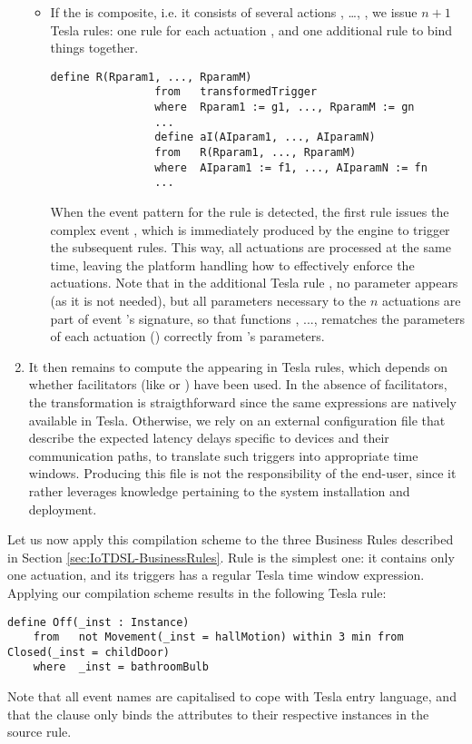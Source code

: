 \begin{enumerate}
\begin{itemize}
		\item If the  is composite, i.e. it consists of several actions , \ldots, , we issue $n+1$ Tesla rules: one rule for each actuation , and one additional rule to bind things together.
		\begin{center}
			\begin{lstlisting}[language=tesla, numbers=none]
				define R(Rparam1, ..., RparamM)
				from   transformedTrigger
				where  Rparam1 := g1, ..., RparamM := gn
				...
				define aI(AIparam1, ..., AIparamN)
				from   R(Rparam1, ..., RparamM)
				where  AIparam1 := f1, ..., AIparamN := fn
				...
			\end{lstlisting}
		\end{center}
		When the event pattern for the rule  is detected, the first rule issues the complex event , which is immediately produced by the \CEP engine to trigger the subsequent rules. This way, all actuations are processed at the same time, leaving the platform handling how to effectively enforce the actuations. Note that in the additional Tesla rule , no  parameter appears (as it is not needed), but all parameters necessary to the $n$ actuations are part of event 's signature, so that functions , ...,  rematches the parameters of each actuation () correctly from 's parameters.
	\end{itemize}
	\item It then remains to compute the  appearing in Tesla rules, which depends on whether facilitators (like  or ) have been used. In the absence of facilitators, the transformation is straigthforward since the same expressions are natively available in Tesla. Otherwise, we rely on an external configuration file that describe the expected latency delays specific to devices and their communication paths, to translate such triggers into appropriate time windows. Producing this file is not the responsibility of the end-user, since it rather leverages knowledge pertaining to the \IOT system installation and deployment. 
\end{enumerate}

Let us now apply this compilation scheme to the three Business Rules described in Section \ref{sec:IoTDSL-BusinessRules}. Rule  is the simplest one: it contains only one actuation, and its triggers has a regular Tesla time window expression. Applying our compilation scheme results in the following Tesla rule:
\begin{lstlisting}[language=tesla, numbers=none]
	define Off(_inst : Instance)
	from   not Movement(_inst = hallMotion) within 3 min from Closed(_inst = childDoor)
	where  _inst = bathroomBulb
\end{lstlisting}
Note that all event names are capitalised to cope with Tesla entry language, and that the  clause only binds the  attributes to their respective instances in the source \IOTDSL rule. 

